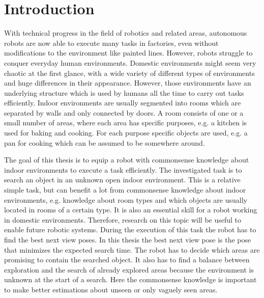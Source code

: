 \chapter{Introduction}

With technical progress in the field of robotics and related areas, autonomous robots are now able to execute many tasks in factories, even without modifications to the environment like painted lines. However, robots struggle to conquer everyday human environments. Domestic environments might seem very chaotic at the first glance, with a wide variety of different types of environments and huge differences in their appearance. However, those environments have an underlying structure which is used by humans all the time to carry out tasks efficiently. Indoor environments are usually segmented into rooms which are separated by walls and only connected by doors. A room consists of one or a small number of areas, where each area has specific purposes, e.g. a kitchen is used for baking and cooking. For each purpose specific objects are used, e.g. a pan for cooking which can be assumed to be somewhere around. 

The goal of this thesis is to equip a robot with commonsense knowledge about indoor environments to execute a task efficiently. The investigated task is to search an object in an unknown open indoor environment. This is a relative simple task, but can benefit a lot from commonsense knowledge about indoor environments, e.g. knowledge about room types and which objects are usually located in rooms of a certain type. It is also an essential skill for a robot working in domestic environments. Therefore, research on this topic will be useful to enable future robotic systems. During the execution of this task the robot has to find the best next view poses. In this thesis the best next view pose is the pose that minimizes the expected search time. The robot has to decide which areas are promising to contain the searched object. It also has to find a balance between exploration and the search of already explored areas because the environment is unknown at the start of a search. Here the commonsense knowledge is important to make better estimations about unseen or only vaguely seen areas. 

